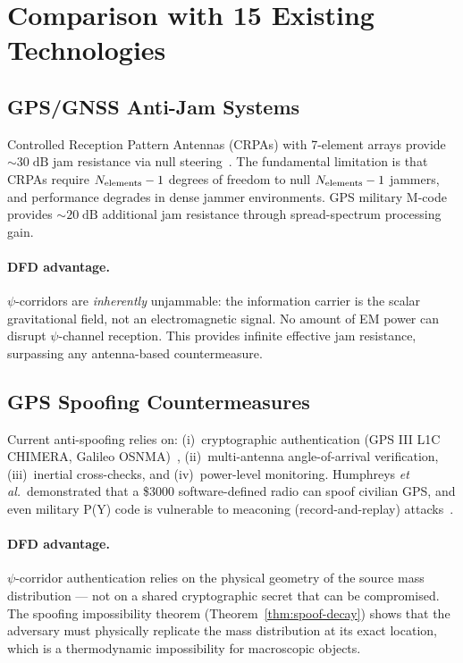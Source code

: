 \documentclass[twocolumn,superscriptaddress,prd,nofootinbib]{revtex4-2}
\begin{document}
\section{Comparison with 15 Existing Technologies}\label{sec:comparison}

\subsection{GPS/GNSS Anti-Jam Systems}

Controlled Reception Pattern Antennas (CRPAs) with 7-element arrays
provide $\sim 30\;\text{dB}$ jam resistance via null
steering~\cite{Fante2004CRPA,Hatke2015CRPA}. The fundamental limitation
is that CRPAs require $N_{\rm elements} - 1$ degrees of freedom to null
$N_{\rm elements}-1$ jammers, and performance degrades in dense jammer
environments. GPS military M-code provides $\sim 20\;\text{dB}$
additional jam resistance through spread-spectrum processing gain.

\paragraph{DFD advantage.}
$\psi$-corridors are \emph{inherently} unjammable: the information
carrier is the scalar gravitational field, not an electromagnetic
signal. No amount of EM power can disrupt $\psi$-channel reception.
This provides infinite effective jam resistance, surpassing any
antenna-based countermeasure.

\subsection{GPS Spoofing Countermeasures}

Current anti-spoofing relies on:
(i)~cryptographic authentication (GPS III L1C CHIMERA, Galileo
OSNMA)~\cite{Humphreys2012,Psiaki2016Spoofing},
(ii)~multi-antenna angle-of-arrival verification,
(iii)~inertial cross-checks, and
(iv)~power-level monitoring.
Humphreys \textit{et al.}~demonstrated that a \$3000 software-defined
radio can spoof civilian GPS, and even military P(Y) code is vulnerable
to meaconing (record-and-replay) attacks~\cite{Humphreys2012}.

\paragraph{DFD advantage.}
$\psi$-corridor authentication relies on the physical geometry of the
source mass distribution --- not on a shared cryptographic secret that
can be compromised. The spoofing impossibility theorem
(Theorem~\ref{thm:spoof-decay}) shows that the adversary must
physically replicate the mass distribution at its exact location, which
is a thermodynamic impossibility for macroscopic objects.
\end{document}
